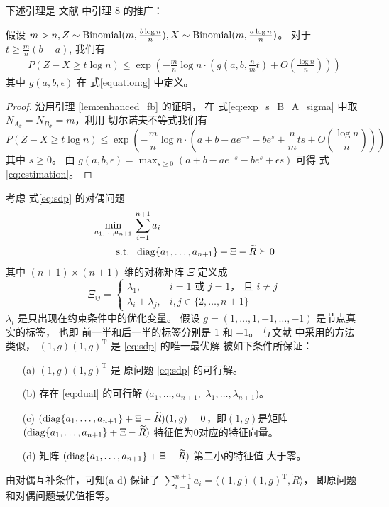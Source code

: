 下述引理是
文献
中引理 8 的推广：
\begin{lemma}\label{lem:zxt}
    假设 $m > n, Z \sim \operatorname{Binomial}(m, \frac{b\log n}{n}), X\sim \operatorname{Binomial}(m, \frac{a\log n}{n})$。
    对于 $ t \geq \frac{m}{n}(b - a)$, 我们有
    \begin{align}\label{eq:estimation}
        P(Z - X \geq t \log n) 
        \leq \exp\left(-\frac{m}{n}\log n \cdot 
        \left( g(a, b, \frac{n}{m}t) + O\left(\frac{\log n}{n} \right)
        \right)
        \right)
    \end{align}
    其中 $g(a,b,\epsilon)$ 在 式\eqref{equation:g} 中定义。
\end{lemma}
\begin{proof}
    沿用引理 \ref{lem:enhanced_fb} 的证明，
在 式\eqref{eq:exp_s_B_A_sigma}
中取  $N_{A_{\bar{\sigma}}}
=N_{B_{\bar{\sigma}}}=m$，利用
切尔诺夫不等式我们有
\begin{equation*}
    P(Z - X \geq t \log n) \leq \exp\left(-\frac{m}{n}\log n \cdot
    \left(a+b-ae^{-s}-be^s+\frac{n}{m}ts + O\left(\frac{\log n}{n} \right)
    \right)
    \right)
\end{equation*}
其中 $s \geq 0$。
由 $g(a,b,\epsilon) = 
\max_{s \geq 0} (a+b-a e^{-s} - b e^s + \epsilon s)$
可得 式 \eqref{eq:estimation}。
\end{proof}
考虑 式\eqref{eq:sdp} 的对偶问题
\begin{align}
    \min_{a_1, \dots, a_{n+1}}\, &\sum_{i=1}^{n+1} a_i \nonumber\\
    \label{eq:dual}
    \textrm{s.t. } &\, \operatorname{diag}\{a_1, \dots, a_{n+1}\} + \Xi - \widetilde{R} \succeq 0
\end{align}
其中 $(n+1)\times (n+1)$ 维的对称矩阵
$\Xi$ 定义成 
\begin{equation}
    \Xi_{ij} = \begin{cases}
        \lambda_1, & i=1\text{ 或 }j=1 \text{， 且 }i\ne j\\
        \lambda_i + \lambda_j, & i, j\in\{2,\ldots,n+1\}
    \end{cases}
\end{equation}
$\lambda_i$ 是只出现在约束条件中的优化变量。
假设 $g=(1,\ldots,1,-1,\ldots,-1)$ 是节点真实的标签，
也即
前一半和后一半的标签分别是  $1$ 和 $-1$。
与文献  中采用的方法类似，
$(1,g)(1,g)^{\mathrm{T}}$ 是 \eqref{eq:sdp} 的唯一最优解
 被如下条件所保证：
\begin{enumerate}
    \item[(a)] $(1,g)(1,g)^{\mathrm{T}}$ 是 原问题 \eqref{eq:sdp} 的可行解。
    \item[(b)] 存在 \eqref{eq:dual} 的可行解 $(a_1,\ldots,a_{n+1},$ $\lambda_1,\ldots,\lambda_{n+1})$。
    \item[(c)] $(\operatorname{diag}\{a_1, \dots, a_{n+1}\} + \Xi - \widetilde{R})(1,g)=0$，即$(1,g)$是矩阵 $(\operatorname{diag}\{a_1, \dots, a_{n+1}\} + \Xi - \widetilde{R})$ 特征值为0对应的特征向量。
    \item[(d)]  矩阵 $(\operatorname{diag}\{a_1, \dots, a_{n+1}\} + \Xi - \widetilde{R})$ 第二小的特征值 大于零。 
\end{enumerate}
由对偶互补条件，可知(a-d) 保证了 
$\sum_{i=1}^{n+1} a_i=\langle(1,g)(1,g)^{\mathrm{T}},\widetilde{R} \rangle$，
即原问题和对偶问题最优值相等。

